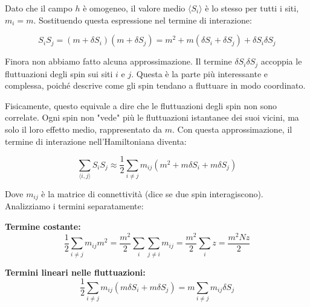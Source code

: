 Dato che il campo $h$ è omogeneo, il valore medio $\langle S_i \rangle$ è lo stesso per tutti i siti, $m_i = m$.
Sostituendo questa espressione nel termine di interazione:

\begin{equation} \label{eq:ch16_26}
S_i S_j = (m + \delta S_i)(m + \delta S_j) = m^2 + m(\delta S_i + \delta S_j) + \delta S_i \delta S_j
\end{equation}

Finora non abbiamo fatto alcuna approssimazione.
Il termine $\delta S_i \delta S_j$ accoppia le fluttuazioni degli spin sui siti $i$ e $j$. Questa è la parte più interessante e complessa, poiché descrive come gli spin tendano a fluttuare in modo coordinato.

\vspace{0.5cm}
\noindent{}
\vspace{0.5cm}

Fisicamente, questo equivale a dire che le fluttuazioni degli spin non sono correlate. Ogni spin non "vede" più le fluttuazioni istantanee dei suoi vicini, ma solo il loro effetto medio, rappresentato da $m$.
Con questa approssimazione, il termine di interazione nell'Hamiltoniana diventa:

\begin{equation} \label{eq:ch16_28}
\sum_{\langle i,j \rangle} S_i S_j \approx \frac{1}{2} \sum_{i \neq j} m_{ij} (m^2 + m\delta S_i + m\delta S_j)
\end{equation}

Dove $m_{ij}$ è la matrice di connettività (dice se due spin interagiscono).
Analizziamo i termini separatamente:

\textbf{Termine costante:}
\begin{equation} \label{eq:ch16_29}
\frac{1}{2} \sum_{i \neq j} m_{ij} m^2 = \frac{m^2}{2} \sum_{i} \sum_{j \neq i} m_{ij} = \frac{m^2}{2} \sum_{i} z = \frac{m^2 N z}{2}
\end{equation}

\textbf{Termini lineari nelle fluttuazioni:}
\begin{equation} \label{eq:ch16_30}
\frac{1}{2} \sum_{i \neq j} m_{ij} (m\delta S_i + m\delta S_j) = m \sum_{i \neq j} m_{ij} \delta S_j
\end{equation}


